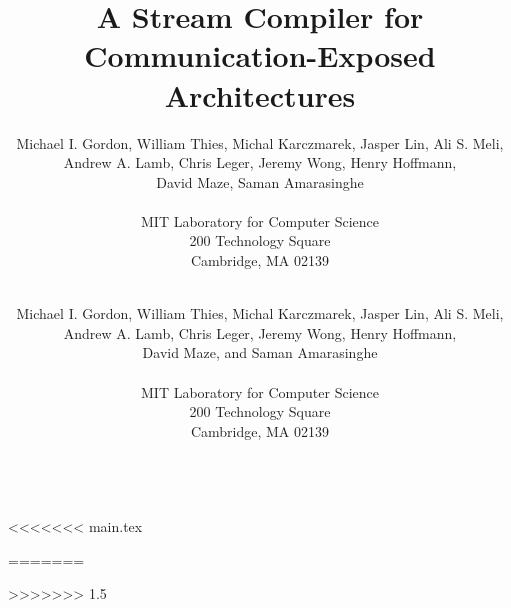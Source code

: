 \documentclass{sig-alternate}
\begin{document}

\title{A Stream Compiler for \\ Communication-Exposed Architectures}


<<<<<<< main.tex
\author{Michael I. Gordon, William Thies, Michal Karczmarek, Jasper Lin, Ali S. Meli,\\ Andrew A. Lamb, Chris Leger, Jeremy Wong, Henry Hoffmann,\\ David Maze, Saman Amarasinghe \\ ~ \\
  MIT Laboratory for Computer Science \\
  200 Technology Square \\
  Cambridge, MA  02139 \\ ~ \\
  }


=======
\author{Michael I. Gordon, William Thies, Michal Karczmarek, Jasper Lin, Ali S. Meli,\\ Andrew A. Lamb, Chris Leger, Jeremy Wong, Henry Hoffmann,\\ David Maze, and Saman Amarasinghe \\ ~ \\
  MIT Laboratory for Computer Science \\
  200 Technology Square \\
  Cambridge, MA  02139 \\ ~ \\
  }

>>>>>>> 1.5
\end{document}
